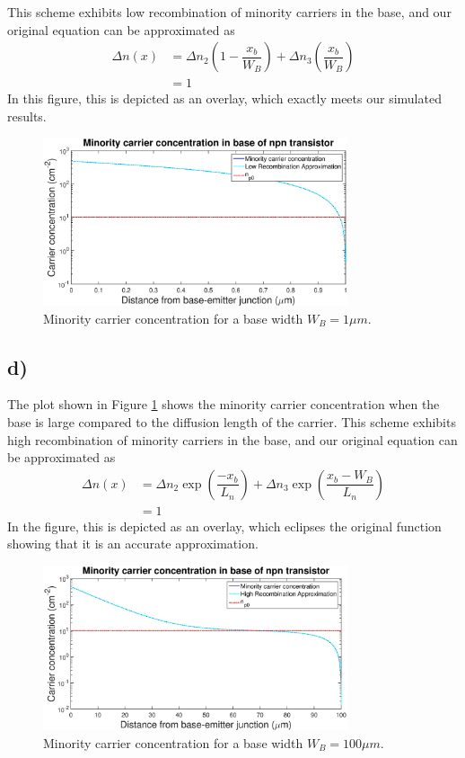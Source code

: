 	This scheme exhibits low recombination of minority carriers in the base, and our original equation can be approximated as
	\[
	\begin{aligned}
		\Delta n(x) &= \Delta n_2 \left(1 - \dfrac{x_b}{W_B}\right) +
		\Delta n_3 \left(\dfrac{x_b}{W_B}\right) \\
					&= 1
	\end{aligned}
	\]
	In this figure, this is depicted as an overlay, which exactly meets our simulated results.
	
	\begin{figure}[htbp!]
		\centering
		\includegraphics[width=0.8\textwidth]{./img/3c}
		\caption{Minority carrier concentration for a base width $W_B = 1 \mu m$.}
		\label{fig::3c}
	\end{figure}
\subsection*{d)}
	The plot shown in Figure \ref{fig::3c} shows the minority carrier concentration when the base is large compared to the diffusion length of the carrier. This scheme exhibits high recombination of minority carriers in the base, and our original equation can be approximated as
	\[
	\begin{aligned}
		\Delta n(x) &= \Delta n_2 \exp\left(\dfrac{-x_b}{L_n}\right) +					\Delta n_3 \exp\left(\dfrac{x_b-W_B}{L_n}\right) \\
					&= 1
	\end{aligned}
	\]
	In the figure, this is depicted as an overlay, which eclipses the original function showing that it is an accurate approximation.
	\begin{figure}[htbp!]
		\centering
		\includegraphics[width=0.8\textwidth]{./img/3d}
		\caption{Minority carrier concentration for a base width $W_B = 100 \mu m$.}
		\label{fig::3d}
	\end{figure}
